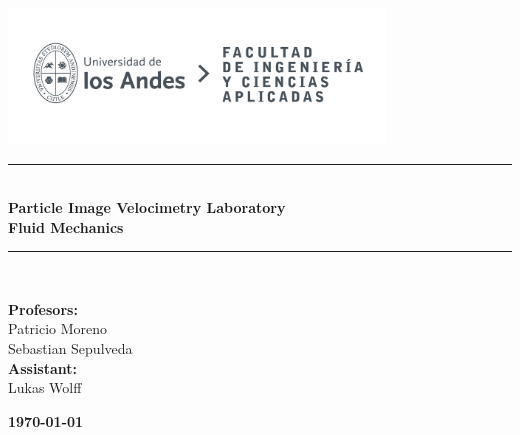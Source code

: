 \documentclass{article} %
\begin{document}
\begin{titlepage}%
\newcommand{\HRule}{\rule{\linewidth}{0.5mm}} 
\center 
\includegraphics[width=10cm]{LOGO_UNIVERSIDAD.jpg}\\ %
\vspace{3cm}
\HRule \\[0.4cm]
{ \huge \bfseries Particle Image Velocimetry Laboratory}\\[0.4cm] %
{ \huge \bfseries Fluid Mechanics}\\[0.4cm] %
\HRule \\[1.5cm]
 \vspace{5cm}
\begin{flushright}
    { \textbf{Profesors:}\\
    Patricio Moreno\\
    Sebastian Sepulveda\\
    \vspace{0.2cm}
    \textbf{Assistant:}\\
    Lukas Wolff\\
    \vspace{0.4cm}
}
\end{flushright}
\vspace{1cm}
{\large \textbf{\today}}\\[2cm] %
\end{titlepage}
\end{document}
